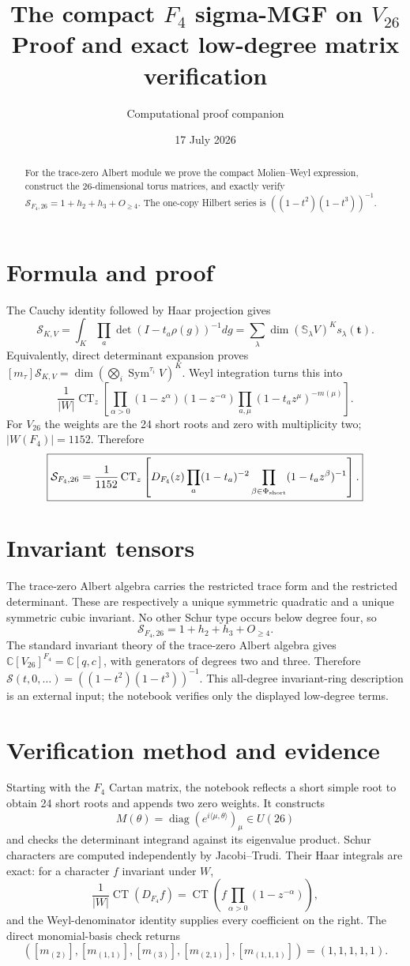 \documentclass[10pt]{article}
\title{\color{navy}\textbf{The compact $F_4$ sigma-MGF on $V_{26}$}\\[1mm]\large Proof and exact low-degree matrix verification}
\author{Computational proof companion}\date{17 July 2026}
\newcommand{\Sg}{\mathcal S}\newcommand{\CT}{\operatorname{CT}}
\begin{document}
\maketitle
\begin{abstract}
For the trace-zero Albert module we prove the compact Molien--Weyl expression,
construct the 26-dimensional torus matrices, and exactly verify
$\Sg_{F_4,26}=1+h_2+h_3+O_{\ge4}$.  The one-copy Hilbert series is
$((1-t^2)(1-t^3))^{-1}$.
\end{abstract}

\section{Formula and proof}
The Cauchy identity followed by Haar projection gives
\[
 \boxed{\Sg_{K,V}=\int_K\prod_a\det(I-t_a\rho(g))^{-1}dg
 =\sum_\lambda\dim(\mathbb S_\lambda V)^K s_\lambda(\mathbf t).}
\]
Equivalently, direct determinant expansion proves
$[m_\tau]\Sg_{K,V}=\dim(\bigotimes_i\operatorname{Sym}^{\tau_i}V)^K$.
Weyl integration turns this into
\[
 \frac1{|W|}\CT_z\left[\prod_{\alpha>0}(1-z^\alpha)(1-z^{-\alpha})
 \prod_{a,\mu}(1-t_a z^\mu)^{-m(\mu)}\right].
\]
For $V_{26}$ the weights are the 24 short roots and zero with multiplicity two;
$|W(F_4)|=1152$.  Therefore
\[
 \boxed{\Sg_{F_4,26}=\frac1{1152}\CT_z\left[D_{F_4}(z)
 \prod_a(1-t_a)^{-2}\prod_{\beta\in\Phi_{\rm short}}
 (1-t_a z^\beta)^{-1}\right].}
\]

\section{Invariant tensors}
The trace-zero Albert algebra carries the restricted trace form and the
restricted determinant.  These are respectively a unique symmetric quadratic
and a unique symmetric cubic invariant.  No other Schur type occurs below
degree four, so
\[
 \boxed{\Sg_{F_4,26}=1+h_2+h_3+O_{\ge4}.}
\]
The standard invariant theory of the trace-zero Albert algebra gives
$\mathbb C[V_{26}]^{F_4}=\mathbb C[q,c]$, with generators of degrees two and
three.  Therefore
$\Sg(t,0,\ldots)=((1-t^2)(1-t^3))^{-1}$.  This all-degree invariant-ring
description is an external input; the notebook verifies only the displayed
low-degree terms.

\section{Verification method and evidence}
Starting with the $F_4$ Cartan matrix, the notebook reflects a short simple
root to obtain 24 short roots and appends two zero weights.  It constructs
\[
 M(\theta)=\operatorname{diag}(e^{i\langle\mu,\theta\rangle})_{\mu}\in U(26)
\]
and checks the determinant integrand against its eigenvalue product.  Schur
characters are computed independently by Jacobi--Trudi.  Their Haar integrals
are exact: for a character $f$ invariant under $W$,
\[
 \frac1{|W|}\CT(D_{F_4}f)=\CT\left(f\prod_{\alpha>0}(1-z^{-\alpha})\right),
\]
and the Weyl-denominator identity supplies every coefficient on the right.
The direct monomial-basis check returns
\[
([m_{(2)}],[m_{(1,1)}],[m_{(3)}],[m_{(2,1)}],[m_{(1,1,1)}])
=(1,1,1,1,1).
\]
\end{document}
